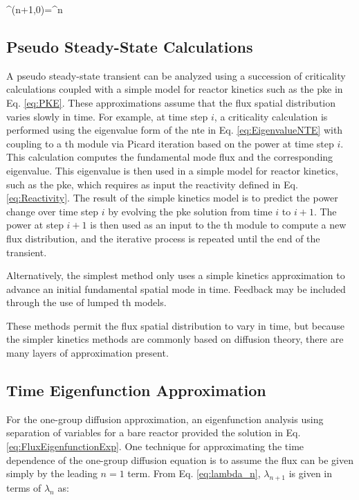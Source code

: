 \beq
\psi^{(n+1,0)}=\psi^{n}
\eeq

\subsection{Pseudo Steady-State Calculations}
\label{sec:PseudoSteadyState}

A pseudo steady-state transient can be analyzed using a succession of criticality calculations coupled with a simple model for reactor kinetics such as the \gls{pke} in Eq. \eqref{eq:PKE}. These approximations assume that the flux spatial distribution varies slowly in time. For example, at time step \(i\), a criticality calculation is performed using the eigenvalue form of the \gls{nte} in Eq. \eqref{eq:EigenvalueNTE} with coupling to a \gls{th} module via Picard iteration based on the power at time step \(i\). This calculation computes the fundamental mode flux and the corresponding eigenvalue. This eigenvalue is then used in a simple model for reactor kinetics, such as the \gls{pke}, which requires as input the reactivity defined in Eq. \eqref{eq:Reactivity}. The result of the simple kinetics model is to predict the power change over time step \(i\) by evolving the \gls{pke} solution from time \(i\) to \(i+1\). The power at step \(i+1\) is then used as an input to the \gls{th} module to compute a new flux distribution, and the iterative process is repeated until the end of the transient.

Alternatively, the simplest method only uses a simple kinetics approximation to advance an initial fundamental spatial mode in time. Feedback may be included through the use of lumped \gls{th} models. 

These methods permit the flux spatial distribution to vary in time, but because the simpler kinetics methods are commonly based on diffusion theory, there are many layers of approximation present. 

\subsection{Time Eigenfunction Approximation}

For the one-group diffusion approximation, an eigenfunction analysis using separation of variables for a bare reactor provided the solution in Eq. \eqref{eq:FluxEigenfunctionExp}. One technique for approximating the time dependence of the one-group diffusion equation is to assume the flux can be given simply by the leading \(n=1\) term. From Eq. \eqref{eq:lambda_n}, \(\lambda_{n+1}\) is given in terms of \(\lambda_n\) as:

